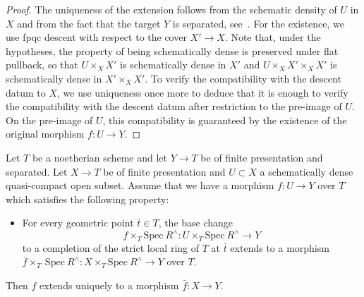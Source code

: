\documentclass[letterpaper,11pt]{amsart}
\begin{document}
\begin{proof} The uniqueness of the extension follows from the schematic density of $U$ in $X$ and from the fact that the target $Y$ is separated, see~\cite[Tag 01RH]{stacks-project}. For the existence, we use fpqc descent with respect to the cover $X'\to X$. Note that, under the hypotheses, the property of being schematically dense is preserved under flat pullback, so that $U\times_{X}X'$ is schematically dense in $X'$ and $U\times_X X'\times_{X} X'$ is schematically dense in $X'\times_X X'$. To verify the compatibility with the descent datum to $X$, we use uniqueness once more to deduce that it is enough to verify the compatibility with the descent datum after restriction to the pre-image of $U$. On the pre-image of $U$, this compatibility is guaranteed by the existence of the original morphism $f:U\to Y$. 
\end{proof}

\begin{lemma}\label{lem:extendability is a local property} 
Let $T$ be a noetherian scheme and let $Y\to T$ be of finite presentation and separated. 
Let $X\to T$ be of finite presentation and $U\subset X$ a schematically dense quasi-compact open subset. 
Assume that we have a morphism $f:U\to Y$ over $T$ which satisfies the following property:
\begin{itemize}
\item  For every geometric point $\bar{t}\in T$, the base change 
\[
f\times_{T} \mathrm{Spec}\ R^\wedge : U\times_T \mathrm{Spec}\ R^{\wedge}\to Y
\] 
to a completion of the strict local ring of $T$ at $\bar{t}$ extends to a morphism
$\bar{f}\times_{T}\ \mathrm{Spec}\ R^{\wedge}: X\times_T \mathrm{Spec}\ R^\wedge \to Y$ over $T$. 
\end{itemize}
Then $f$ extends uniquely to a morphism $\bar{f}: X\to Y$. 
\end{lemma}
\end{document}
